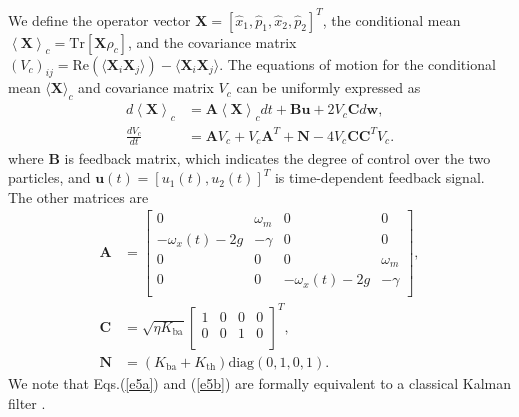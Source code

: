 \documentclass[
aps,
reprint,
superscriptaddress,
amsmath,amssymb,
pra
]{revtex4-2}
\begin{document}
We define the operator vector $\mathbf{X}=[\hat x_1, \hat p_1, \hat x_2, \hat p_2]^T$, the conditional mean $\left \langle \mathbf{X}  \right \rangle _c=\mathrm{Tr} [\mathbf{X}\hat \rho _c]$, and the covariance matrix $(V_c)_{ij}=\mathrm{Re}(\langle \mathbf{X}_i\mathbf{X}_j \rangle) - \langle \mathbf{X}_i\mathbf{X}_j\rangle$. The equations of motion for the conditional mean $\langle\mathbf{X}\rangle_c$ and covariance matrix $V_c$ can be uniformly expressed as \cite{PhysRevResearch.1.033161, PhysRevA.100.023843}
\begin{subequations}
\begin{align}
   d{{\left\langle \mathbf{X} \right\rangle }_{c}}& = \mathbf A{{\left\langle \mathbf{X} \right\rangle }_{c}}dt + \mathbf {Bu} + 2{{V }_{c}}\mathbf Cd\mathbf{w}, \label{e5a}\\ 
  \frac{d{{V }_{c}}}{dt}& = \mathbf A{{V }_{c}} + {{V }_{c}}{\mathbf{A}^{T}} + \mathbf N-4{{V }_{c}}\mathbf C{\mathbf{C}^{T}}{{V }_{c}}.
  \label{e5b}
\end{align}
\label{e5}
\end{subequations}
where $\mathbf B$ is feedback matrix, which indicates the degree of control over the two particles, and $\mathbf u(t) = [u_1(t), u_2(t)]^T$ is time-dependent feedback signal. The other matrices are
\begin{align}
\mathbf{A} & = \left[ \begin{matrix}
   0 & {{\omega }_{m}} & 0 & 0  \\
   -{{\omega }_{x}}\left( t \right) - 2g & -\gamma & 0 & 0  \\
   0 & 0 & 0 & {{\omega }_{m}}  \\
   0 & 0 & -{{\omega }_{x}}\left( t \right)-2g & -\gamma  \\
\end{matrix} \right], 
\nonumber \\
\mathbf{C} & = \sqrt{\eta {{K }_{\text{ba}}}}{{\left[ \begin{matrix}
   1 & 0 & 0 & 0  \\
   0 & 0 & 1 & 0  \\
\end{matrix} \right]}^{T}},
\nonumber \\
\mathbf N&=(K_{\text{ba}}+K_{\text{th}})\text{diag}(0,1,0,1).
\end{align}
We note that Eqs.(\ref{e5a}) and (\ref{e5b}) are formally equivalent to a classical Kalman filter \cite{wiseman2009quantum}.


\end{document}
